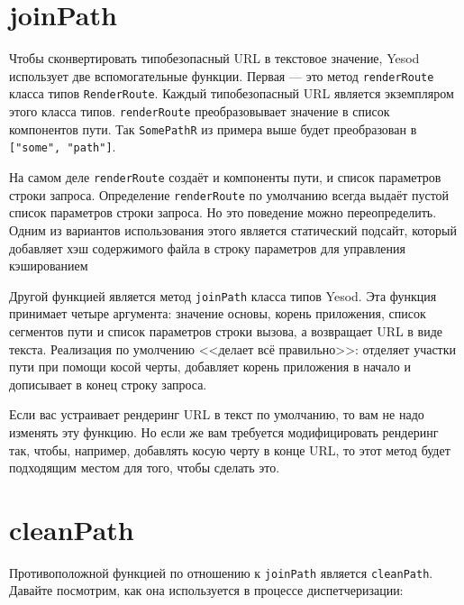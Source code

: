 \section {joinPath}

Чтобы сконвертировать типобезопасный URL в текстовое значение, Yesod использует две вспомогательные функции. Первая --- это метод \lstinline!renderRoute! класса типов \lstinline!RenderRoute!. Каждый типобезопасный URL является экземпляром этого класса типов. \lstinline!renderRoute! преобразовывает значение в список компонентов пути. Так \lstinline!SomePathR! из примера выше будет преобразован в \lstinline!["some", "path"]!.

\begin{remark}
На самом деле \lstinline!renderRoute! создаёт и компоненты пути, и список параметров строки запроса. Определение \lstinline!renderRoute! по умолчанию всегда выдаёт пустой список параметров строки запроса. Но это поведение можно переопределить. Одним из вариантов использования этого является статический подсайт, который добавляет хэш содержимого файла в строку параметров для управления кэшированием
\end{remark}

Другой функцией является метод \lstinline!joinPath! класса типов Yesod. Эта функция принимает четыре аргумента: значение основы, корень приложения, список сегментов пути и список параметров строки вызова, а возвращает URL в виде текста. Реализация по умолчению <<делает всё правильно>>: отделяет участки пути при помощи косой черты, добавляет корень приложения в начало и дописывает в конец строку запроса.

Если вас устраивает рендеринг URL в текст по умолчанию, то вам не надо изменять эту функцию. Но если же вам требуется модифицировать рендеринг так, чтобы, например, добавлять косую черту в конце URL, то этот метод будет подходящим местом для того, чтобы сделать это.

\section {cleanPath}

Противоположной функцией по отношению к \lstinline!joinPath! является \lstinline!cleanPath!. Давайте посмотрим, как она используется в процессе диспетчеризации:

